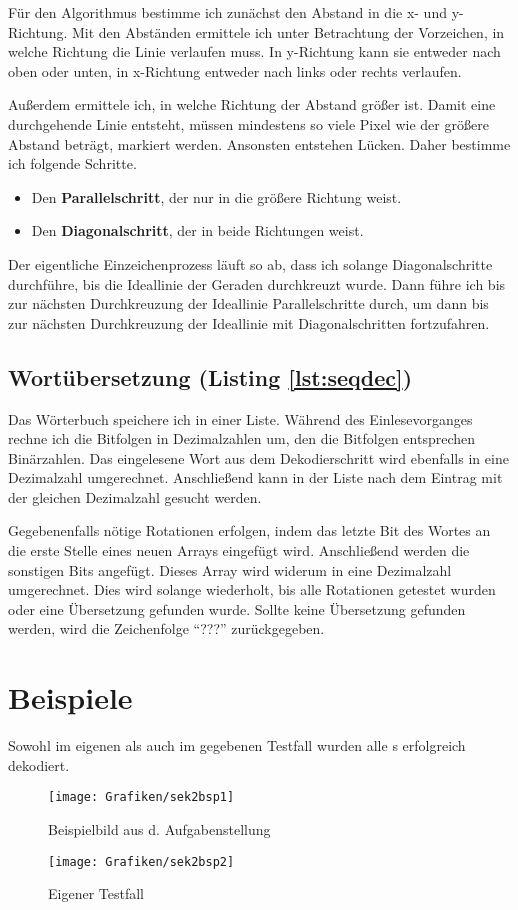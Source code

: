 Für den Algorithmus bestimme ich zunächst den Abstand in die x- und y-Richtung. Mit den Abständen ermittele ich unter Betrachtung der Vorzeichen, in welche Richtung die Linie verlaufen muss. In y-Richtung kann sie entweder nach oben oder unten, in x-Richtung entweder nach links oder rechts verlaufen.

Außerdem ermittele ich, in welche Richtung der Abstand größer ist.
Damit eine durchgehende Linie entsteht, müssen mindestens so viele Pixel wie der größere Abstand beträgt, markiert werden. Ansonsten entstehen Lücken. Daher bestimme ich folgende Schritte.
\begin{itemize}
	\item Den \textbf{Parallelschritt}, der nur in die größere Richtung weist. 
	\item Den \textbf{Diagonalschritt}, der in beide Richtungen weist.
\end{itemize}

Der eigentliche Einzeichenprozess läuft so ab, dass ich solange Diagonalschritte durchführe, bis die Ideallinie der Geraden durchkreuzt wurde. Dann führe ich bis zur nächsten Durchkreuzung der Ideallinie Parallelschritte durch, um dann bis zur nächsten Durchkreuzung der Ideallinie mit Diagonalschritten fortzufahren.

\subsection{Wortübersetzung (Listing \ref{lst:seqdec})}
Das Wörterbuch speichere ich in einer Liste. Während des Einlesevorganges rechne ich die Bitfolgen in Dezimalzahlen um, den die Bitfolgen entsprechen Binärzahlen.
Das eingelesene Wort aus dem Dekodierschritt wird ebenfalls in eine Dezimalzahl umgerechnet. Anschließend kann in der Liste nach dem Eintrag mit der gleichen Dezimalzahl gesucht werden.

Gegebenenfalls nötige Rotationen erfolgen, indem das letzte Bit des Wortes an die erste Stelle eines neuen Arrays eingefügt wird. Anschließend werden die sonstigen Bits angefügt.
Dieses Array wird widerum in eine Dezimalzahl umgerechnet. Dies wird solange wiederholt, bis alle Rotationen getestet wurden oder eine Übersetzung gefunden wurde.
Sollte keine Übersetzung gefunden werden, wird die Zeichenfolge "`???"' zurückgegeben. 

\pagebreak
\section{Beispiele}
Sowohl im eigenen als auch im gegebenen Testfall wurden alle \task{}s erfolgreich dekodiert.
\begin{figure}[!ht]
	\centering	
	\texttt{[image: Grafiken/sek2bsp1]}
	\caption{Beispielbild aus d. Aufgabenstellung}
\end{figure}
\vfill{}
\begin{figure}[!ht]
	\centering	
	\texttt{[image: Grafiken/sek2bsp2]}
	\caption{Eigener Testfall}
\end{figure}
